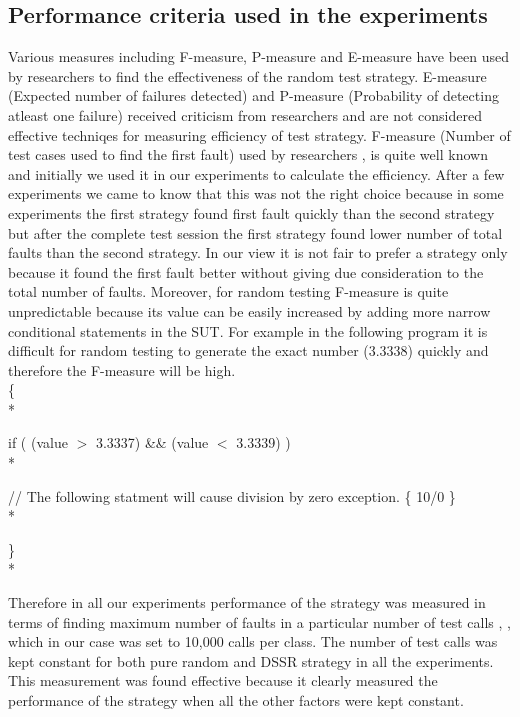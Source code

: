 \subsection{Performance criteria used in the experiments}
Various measures including F-measure, P-measure and E-measure have been used by researchers to find the effectiveness of the random test strategy. E-measure (Expected number of failures detected) and P-measure (Probability of detecting atleast one failure) received criticism from researchers \cite{Chen2008} and are not considered effective techniqes for measuring efficiency of test strategy. F-measure (Number of test cases used to find the first fault) used by researchers  \cite{Chen1996}, \cite{Chen2004} is quite well known and initially we used it in our experiments to calculate the efficiency. After a few experiments we came to know that this was not the right choice because in some experiments the first strategy found first fault quickly than the second strategy but after the complete test session the first strategy found lower number of total faults than the second strategy. In our view it is not fair to prefer a strategy only because it found the first fault better without giving due consideration to the total number of faults. Moreover, for random testing F-measure is quite unpredictable because its value can be easily increased by adding more narrow conditional statements in the SUT. For example in the following program it is difficult for random testing to generate the exact number (3.3338) quickly and therefore the F-measure will be high.\\

\{ \\*   

\hspace{07 mm}if ( (value $>$  3.3337) \&\& (value $<$ 3.3339) )\\*

// The following statment will cause division by zero exception.
\hspace{07 mm}\{ 10/0 \} \\* 

\} \\*

Therefore in all our experiments performance of the strategy was measured in terms of finding maximum number of faults in a particular number of test calls  \cite{Ciupa2007}, \cite{Pacheco2007a}, \cite{Ciupa2008b} which in our case was set to 10,000 calls per class. The number of test calls was kept constant for both pure random and DSSR strategy in all the experiments. This measurement was found effective because it clearly measured the performance of the strategy when all the other factors were kept constant.\\


